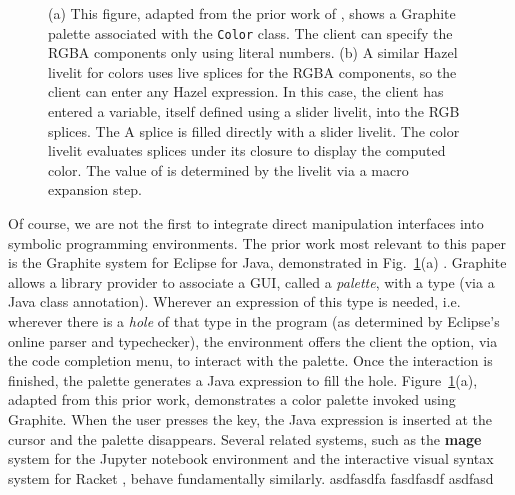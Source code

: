 \begin{figure}
\begin{subfigure}[t]{0.585\textwidth}
  \end{subfigure}
   \caption{
   (a) This figure, adapted from the prior work of \citet{Graphite},
   shows a Graphite palette associated with the \texttt{Color} class.
   The client can specify the RGBA components only using literal numbers.
   (b) A similar Hazel livelit for colors uses live splices for the RGBA components,
   so the client can enter any Hazel expression.
   In this case, the client has entered a variable, itself defined using a slider livelit, into the RGB
   splices. The A splice is filled directly with a slider livelit.
   The color livelit evaluates splices under its closure to display the
   computed color.
   The value of  is determined by the livelit via a macro expansion step.}
   \label{fig:color}
\end{figure}

Of course, we are not the first to integrate direct manipulation interfaces
into symbolic programming environments.
The prior work most relevant to this paper is the {Graphite} system for Eclipse for Java,
demonstrated in Fig.~\ref{fig:color}(a) \cite{Graphite}.
Graphite allows a library provider to associate a GUI, called a \emph{palette}, with a type 
(via a Java class annotation).
Wherever an expression of this type is needed,
i.e. wherever there is a \emph{hole} of that type in the program
(as determined by Eclipse's online parser and typechecker),
the environment offers the client the option, via the code completion menu,
to interact with the palette.
Once the interaction is finished, the palette generates a
Java expression to fill the hole.
Figure~\ref{fig:color}(a), adapted from this prior work, demonstrates a color palette invoked using Graphite.
When the user presses the  key, the Java expression  is inserted at the cursor and the palette disappears.
Several related systems, such as the  
\textbf{mage} system for the Jupyter notebook environment \cite{DBLP:conf/uist/KeryRHMWP20}
and the interactive visual syntax system for Racket \cite{interactive-visual-syntax}, behave fundamentally similarly.
asdfasdfa
fasdfasdf
asdfasd

